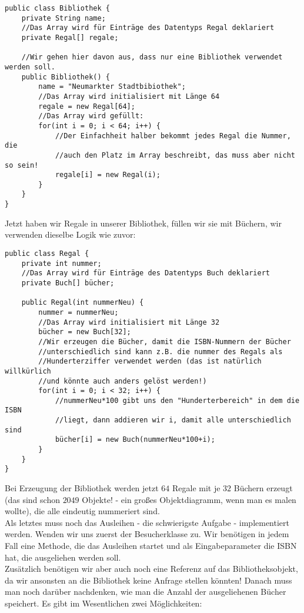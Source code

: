 \documentclass{article}
\begin{document}
\begin{verbatim}
public class Bibliothek {
    private String name;
    //Das Array wird für Einträge des Datentyps Regal deklariert
    private Regal[] regale;

    //Wir gehen hier davon aus, dass nur eine Bibliothek verwendet werden soll.
    public Bibliothek() {
        name = "Neumarkter Stadtbibiothek";
        //Das Array wird initialisiert mit Länge 64
        regale = new Regal[64];
        //Das Array wird gefüllt:
        for(int i = 0; i < 64; i++) {
            //Der Einfachheit halber bekommt jedes Regal die Nummer, die 
            //auch den Platz im Array beschreibt, das muss aber nicht so sein!
            regale[i] = new Regal(i);
        }
    }
}
\end{verbatim}
Jetzt haben wir  Regale in unserer Bibliothek, füllen wir sie mit Büchern, wir verwenden dieselbe Logik wie zuvor:

\begin{verbatim}
public class Regal {
    private int nummer;
    //Das Array wird für Einträge des Datentyps Buch deklariert
    private Buch[] bücher;

    public Regal(int nummerNeu) {
        nummer = nummerNeu;
        //Das Array wird initialisiert mit Länge 32
        bücher = new Buch[32];
        //Wir erzeugen die Bücher, damit die ISBN-Nummern der Bücher 
        //unterschiedlich sind kann z.B. die nummer des Regals als
        //Hunderterziffer verwendet werden (das ist natürlich willkürlich
        //und könnte auch anders gelöst werden!)
        for(int i = 0; i < 32; i++) {
            //nummerNeu*100 gibt uns den "Hunderterbereich" in dem die ISBN
            //liegt, dann addieren wir i, damit alle unterschiedlich sind
            bücher[i] = new Buch(nummerNeu*100+i);
        }
    } 
}
\end{verbatim}
Bei Erzeugung der Bibliothek werden jetzt $64$ Regale mit je $32$ Büchern erzeugt (das sind schon $2049$ Objekte! - ein großes Objektdiagramm, wenn man es malen wollte), die alle eindeutig nummeriert sind. \\
Als letztes muss noch das Ausleihen - die schwierigste Aufgabe - implementiert werden. Wenden wir uns zuerst der Besucherklasse zu. Wir benötigen in jedem Fall eine Methode, die das Ausleihen startet und als Eingabeparameter die ISBN hat, die ausgeliehen werden soll. \\
Zusätzlich benötigen wir aber auch noch eine Referenz auf das Bibliotheksobjekt, da wir ansonsten an die Bibliothek keine Anfrage stellen könnten! Danach muss man noch darüber nachdenken, wie man die Anzahl der ausgeliehenen Bücher speichert. Es gibt im Wesentlichen zwei Möglichkeiten:
\end{document}
